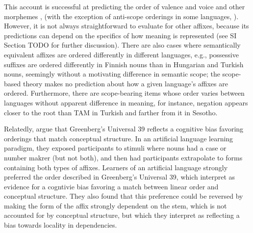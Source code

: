 \documentclass[11pt,letterpaper]{article}
\newcommand{\citep}{\parencite}
\newcommand{\citet}{\Textcite}
\newcommand\mhahn[1]{{\color{red}(#1)}}
\newcommand{\jd}[1]{\textcolor{Pink}{[jd: #1]}}
\begin{document}
This account is successful at predicting the order of valence and voice and other morphemes \citep[e.g.,][]{rice2000morpheme, caballero2010scope,  narrog2010the, korotkova2010deriving}, (with the exception of anti-scope orderings in some languages, \citep{...}).
However, it is not always straightforward to evaluate for other affixes, because its predictions can depend on the specifics of how meaning is represented (see SI Section TODO for further discussion).
There are also cases where semantically equivalent affixes are ordered differently in different languages, e.g., possessive suffixes are ordered differently in Finnish nouns than in Hungarian and Turkish nouns, seemingly without a motivating difference in semantic scope; the scope-based theory makes no prediction about how a given language's affixes are ordered.
Furthermore, there are scope-bearing items whose order varies between languages without apparent difference in meaning, for instance, negation appears closer to the root than TAM in Turkish and farther from it in Sesotho.

Relatedly, \citet{saldana2021cross} argue that Greenberg's Universal 39 reflects a cognitive bias favoring orderings that match conceptual structure.
In an artificial language learning paradigm, they exposed participants to stimuli where nouns had a case or number makrer (but not both), and then had participants extrapolate to forms containing both types of affixes.
Learners of an artificial language strongly preferred the order described in Greenberg's Universal 39, which \citet{saldana2021cross} interpret as evidence for a cogntivie bias favoring a match between linear order and conceptual structure.
They also found that this preference could be reversed by making the form of the affix strongly dependent on the stem, which is not accounted for by conceptual structure, but which they interpret as reflecting a bias towards locality in dependencies.


\end{document}
